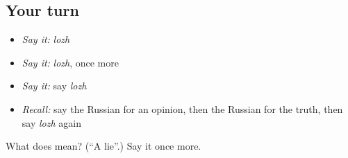 \subsection*{Your turn}
\begin{itemize}
\raggedright
  \item \emph{Say it:} \emph{lozh}
  \item \emph{Say it:} \emph{lozh}, once more
  \item \emph{Say it:} say \emph{lozh}
  \item \emph{Recall:} say the Russian for an opinion, then the Russian for the truth, then say \emph{lozh} again
\end{itemize}

\begin{tcolorbox}[breakable,colback=teal!4,colframe=teal!35!black,title={Before you move on}]
What does  mean? (\textquotedblleft{}A lie\textquotedblright{}.) Say it once more.
\end{tcolorbox}
